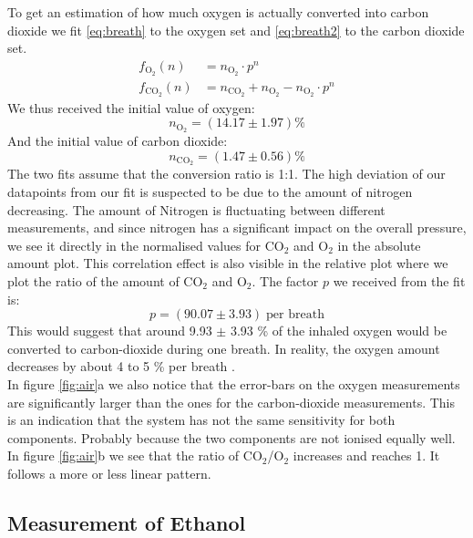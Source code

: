     
    To get an estimation of how much oxygen is actually converted into carbon dioxide we fit \eqref{eq:breath} to the oxygen set and \eqref{eq:breath2} to the carbon dioxide set.
    \begin{align}
        f_{\text{O}_2}(n) &= n_{\text{O}_2} \cdot p^n \label{eq:breath}\\
        f_{\text{CO}_2}(n) &= n_{\text{CO}_2} +  n_{\text{O}_2} - n_{\text{O}_2} \cdot p^n \label{eq:breath2}
    \end{align}
    We thus received the initial value of oxygen:
    $$ n_{\text{O}_2} = (14.17 \pm 1.97) \%$$
    And the initial value of carbon dioxide:
    $$ n_{\text{CO}_2} = (1.47 \pm 0.56) \%$$
    The two fits assume that the conversion ratio is 1:1. The high deviation of our datapoints from our fit is suspected to be due to the amount of nitrogen decreasing. The amount of Nitrogen is fluctuating between different measurements, and since nitrogen has a significant impact on the overall pressure, we see it directly in the normalised values for CO$_2$ and O$_2$ in the absolute amount plot. This correlation effect is also visible in  the relative plot where we plot the ratio of the amount of CO$_2$ and O$_2$. The factor $p$ we received from the fit is:
    $$p = (90.07 \pm 3.93) \;\text{per breath}$$
    This would suggest that around 9.93 $\pm$ 3.93 \% of the inhaled oxygen would be converted to carbon-dioxide during one breath.
    In reality, the oxygen amount decreases by about 4 to 5 \% per breath \cite{breath}.\\
    In figure \ref{fig:air}a we also notice that the error-bars on the oxygen measurements are significantly larger than the ones for the carbon-dioxide measurements. This is an indication that the system has not the same sensitivity for both components. Probably because the two components are not ionised equally well.
    In figure \ref{fig:air}b we see that the ratio of CO$_2$/O$_2$ increases and reaches 1. It follows a more or less linear pattern.
    
    
    \subsection{Measurement of Ethanol}
    
